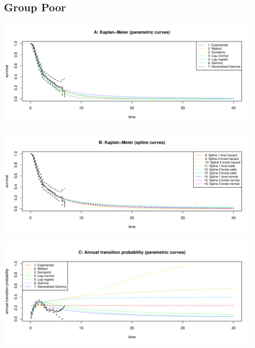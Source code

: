 \documentclass[]{article}
\begin{document}
\newpage

\subsection{Group Poor}\label{group-poor}

\begin{flushleft}\includegraphics[height=0.29\textheight]{Images/validate_extrapolation3-1} \end{flushleft}

\begin{flushleft}\includegraphics[height=0.29\textheight]{Images/validate_extrapolation3-2} \end{flushleft}

\begin{flushleft}\includegraphics[height=0.29\textheight]{Images/validate_extrapolation3-3} \end{flushleft}
\end{document}

